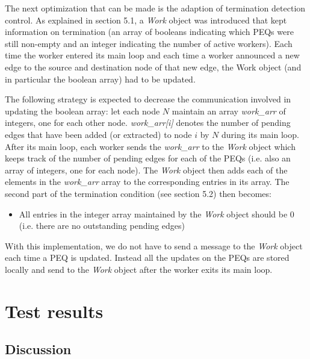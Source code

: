 The next optimization that can be made is the adaption of
termination detection control. As explained in section 5.1, a 
{\em Work} object was introduced that kept information on
termination (an array of booleans indicating which PEQs were
still non-empty and an integer indicating the number of active
workers). 
Each time the worker entered its main loop and each time a worker announced a
new edge to the source and destination node of that new edge, the Work
object (and in particular the boolean array) had to be updated.

The following strategy is expected to decrease the communication
involved in updating the boolean array: let each node $N$ maintain an
array {\em work\_arr} of integers, one for each other node. 
{\em work\_arr[i]} denotes the number of pending edges that have been
added (or extracted) to node $i$ by $N$ during its main loop. After its main loop, each
worker sends the {\em work\_arr} to the {\em Work} object which keeps
track of the number of pending edges for each of the PEQs (i.e. also
an array of integers, one for each node). The {\em Work} object then
adds each of the elements in the {\em work\_arr} array to the
corresponding entries in its array. The second part of the termination
condition (see section 5.2) then becomes:

\begin{itemize}

\item
All entries in the integer array maintained by the {\em Work} object
should be 0 (i.e. there are no outstanding pending edges)

\end{itemize}

With this implementation, we do not have to send a message to the {\em Work}
object each time a PEQ is updated. Instead all the updates on the
PEQs are stored locally and send to the {\em Work} object after the
worker exits its main loop.

\section{Test results}

\subsection{Discussion}

